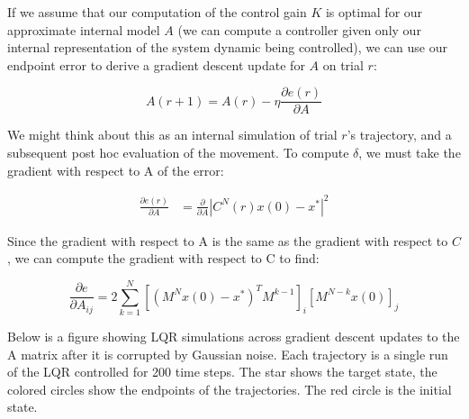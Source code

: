 \documentclass[
  a4paper,
]{article}
\begin{document}
If we assume that our computation of the control gain \(K\) is optimal
for our approximate internal model \(A\) (we can compute a controller
given only our internal representation of the system dynamic being
controlled), we can use our endpoint error to derive a gradient descent
update for \(A\) on trial \(r\):

\[
A(r+1) = A(r) - \eta\frac{\partial{e(r)}}{\partial{A}}
\]

We might think about this as an internal simulation of trial \(r\)'s
trajectory, and a subsequent post hoc evaluation of the movement. To
compute \(\delta\), we must take the gradient with respect to A of the
error:

\[
\begin{aligned}
\frac{\partial{e(r)}}{\partial{A}} &= \frac{\partial{}}{\partial{A}}{|C^N(r)x(0) - x^*|^2}
\end{aligned}
\]

Since the gradient with respect to A is the same as the gradient with
respect to \(C\), we can compute the gradient with respect to C to find:

\[
\frac{\partial{e}}{\partial{A_{ij}}} = 2\sum_{k=1}^N\left[(M^Nx(0) - x^*)^TM^{k-1}\right]_i\left[M^{N-k}x(0)\right]_j
\]

Below is a figure showing LQR simulations across gradient descent
updates to the A matrix after it is corrupted by Gaussian noise. Each
trajectory is a single run of the LQR controlled for 200 time steps. The
star shows the target state, the colored circles show the endpoints of
the trajectories. The red circle is the initial state.
\end{document}
